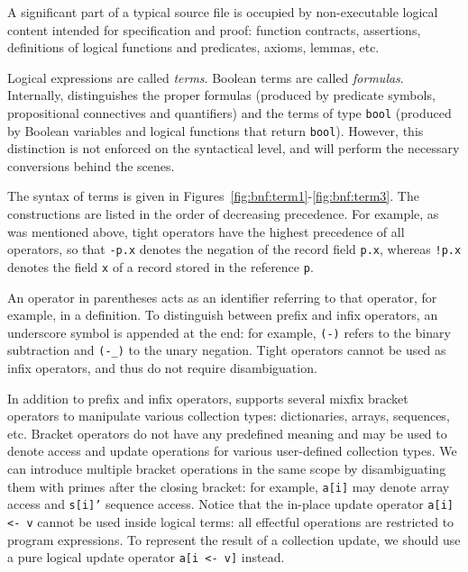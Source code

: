 A significant part of a typical \whyml source file is occupied
by non-executable logical content intended for specification
and proof: function contracts, assertions, definitions of
logical functions and predicates, axioms, lemmas, etc.

Logical expressions are called \textit{terms}. Boolean
terms are called \textit{formulas}. Internally, \why distinguishes
the proper formulas (produced by predicate symbols, propositional
connectives and quantifiers) and the terms of type \texttt{bool}
(produced by Boolean variables and logical functions that return
\texttt{bool}). However, this distinction is not enforced on the
syntactical level, and \why will perform the necessary conversions
behind the scenes.

The syntax of \whyml terms is given in
Figures~\ref{fig:bnf:term1}-\ref{fig:bnf:term3}.
The constructions are listed in the order of
decreasing precedence.
For example, as was mentioned above,
tight operators have the highest precedence of all operators,
so that \texttt{-p.x} denotes the negation of the
record field \texttt{p.x}, whereas \texttt{!p.x}
denotes the field \texttt{x} of a record stored
in the reference \texttt{p}.

An operator in parentheses acts as an identifier
referring to that operator, for example, in a definition.
To distinguish between prefix and infix operators, an
underscore symbol is appended at the end: for example,
\texttt{(-)} refers to the binary subtraction and
\texttt{(-\_)} to the unary negation.
Tight operators cannot be used as infix operators,
and thus do not require disambiguation.

In addition to prefix and infix operators, \whyml
supports several mixfix bracket operators to
manipulate various collection types: dictionaries,
arrays, sequences, etc. Bracket operators do not have
any predefined meaning and may be used to denote access
and update operations for various user-defined collection types.
We can introduce multiple bracket operations in the same scope
by disambiguating them with primes after the closing
bracket: for example, \texttt{a[i]} may denote array access
and \texttt{s[i]'} sequence access.
Notice that the in-place update operator \texttt{a[i] <- v}
cannot be used inside logical terms: all effectful operations
are restricted to program expressions. To represent the result
of a collection update, we should use a pure logical update
operator \texttt{a[i <- v]} instead.

